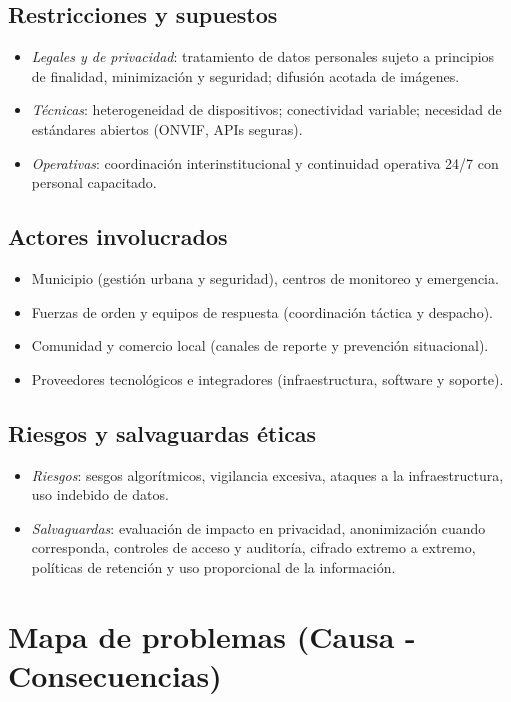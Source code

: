 \documentclass[12pt,a4paper]{article}
\begin{document}
\subsection*{Restricciones y supuestos}
\begin{itemize}
    \item \textit{Legales y de privacidad}: tratamiento de datos personales sujeto a principios de finalidad, minimización y seguridad; difusión acotada de imágenes.
    \item \textit{Técnicas}: heterogeneidad de dispositivos; conectividad variable; necesidad de estándares abiertos (ONVIF, APIs seguras).
    \item \textit{Operativas}: coordinación interinstitucional y continuidad operativa 24/7 con personal capacitado.
\end{itemize}

\subsection*{Actores involucrados}
\begin{itemize}
    \item Municipio (gestión urbana y seguridad), centros de monitoreo y emergencia.
    \item Fuerzas de orden y equipos de respuesta (coordinación táctica y despacho).
    \item Comunidad y comercio local (canales de reporte y prevención situacional).
    \item Proveedores tecnológicos e integradores (infraestructura, software y soporte).
\end{itemize}

\subsection*{Riesgos y salvaguardas éticas}
\begin{itemize}
    \item \textit{Riesgos}: sesgos algorítmicos, vigilancia excesiva, ataques a la infraestructura, uso indebido de datos.
    \item \textit{Salvaguardas}: evaluación de impacto en privacidad, anonimización cuando corresponda, controles de acceso y auditoría, cifrado extremo a extremo, políticas de retención y uso proporcional de la información.
\end{itemize}


\newpage

\section{Mapa de problemas (Causa - Consecuencias)}
\end{document}
